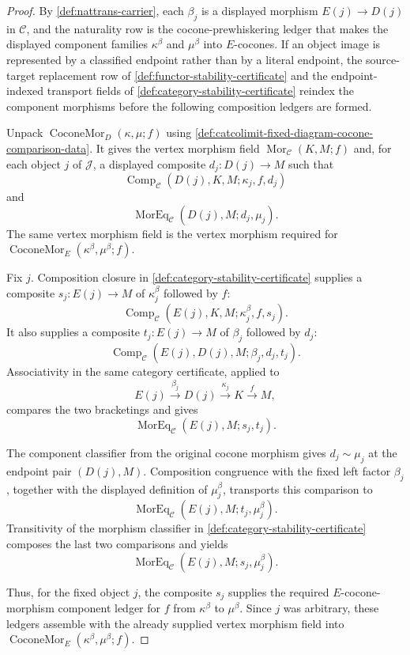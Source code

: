 \begin{proof}
By \autoref{def:nattrans-carrier}, each $\beta_j$ is a displayed morphism $E(j)\to D(j)$ in $\mathcal C$, and the naturality row is the cocone-prewhiskering ledger that makes the displayed component families $\kappa^{\beta}$ and $\mu^{\beta}$ into $E$-cocones. If an object image is represented by a classified endpoint rather than by a literal endpoint, the source-target replacement row of \autoref{def:functor-stability-certificate} and the endpoint-indexed transport fields of \autoref{def:category-stability-certificate} reindex the component morphisms before the following composition ledgers are formed.

Unpack $\operatorname{CoconeMor}_{D}(\kappa,\mu;f)$ using \autoref{def:catcolimit-fixed-diagram-cocone-comparison-data}. It gives the vertex morphism field $\operatorname{Mor}_{\mathcal C}(K,M;f)$ and, for each object $j$ of $\mathcal J$, a displayed composite $d_j:D(j)\to M$ such that
$$
\operatorname{Comp}_{\mathcal C}(D(j),K,M;\kappa_j,f,d_j)
$$
and
$$
\operatorname{MorEq}_{\mathcal C}(D(j),M;d_j,\mu_j).
$$
The same vertex morphism field is the vertex morphism required for $\operatorname{CoconeMor}_{E}(\kappa^{\beta},\mu^{\beta};f)$.

Fix $j$. Composition closure in \autoref{def:category-stability-certificate} supplies a composite $s_j:E(j)\to M$ of $\kappa^{\beta}_j$ followed by $f$:
$$
\operatorname{Comp}_{\mathcal C}(E(j),K,M;\kappa^{\beta}_j,f,s_j).
$$
It also supplies a composite $t_j:E(j)\to M$ of $\beta_j$ followed by $d_j$:
$$
\operatorname{Comp}_{\mathcal C}(E(j),D(j),M;\beta_j,d_j,t_j).
$$
Associativity in the same category certificate, applied to
$$
E(j)\xrightarrow{\beta_j}D(j)\xrightarrow{\kappa_j}K\xrightarrow{f}M,
$$
compares the two bracketings and gives
$$
\operatorname{MorEq}_{\mathcal C}(E(j),M;s_j,t_j).
$$

The component classifier from the original cocone morphism gives $d_j\sim\mu_j$ at the endpoint pair $(D(j),M)$. Composition congruence with the fixed left factor $\beta_j$, together with the displayed definition of $\mu^{\beta}_j$, transports this comparison to
$$
\operatorname{MorEq}_{\mathcal C}(E(j),M;t_j,\mu^{\beta}_j).
$$
Transitivity of the morphism classifier in \autoref{def:category-stability-certificate} composes the last two comparisons and yields
$$
\operatorname{MorEq}_{\mathcal C}(E(j),M;s_j,\mu^{\beta}_j).
$$

Thus, for the fixed object $j$, the composite $s_j$ supplies the required $E$-cocone-morphism component ledger for $f$ from $\kappa^{\beta}$ to $\mu^{\beta}$. Since $j$ was arbitrary, these ledgers assemble with the already supplied vertex morphism field into $\operatorname{CoconeMor}_{E}(\kappa^{\beta},\mu^{\beta};f)$.
\end{proof}

